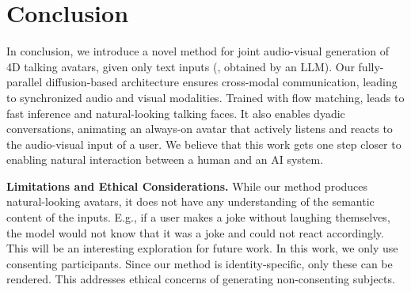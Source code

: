 \section{Conclusion}
\label{sec:conclusion}

In conclusion, we introduce a novel method for joint audio-visual generation of 4D talking avatars, given only text inputs (\eg, obtained by an LLM). Our fully-parallel diffusion-based architecture ensures cross-modal communication, leading to synchronized audio and visual modalities. Trained with flow matching, \MethodName leads to fast inference and natural-looking talking faces. It also enables dyadic conversations, animating an always-on avatar that actively listens and reacts to the audio-visual input of a user. We believe that this work gets one step closer to enabling natural interaction between a human and an AI system. 

\noindent
\textbf{Limitations and Ethical Considerations.}
While our method produces natural-looking avatars, it does not have any understanding of the semantic content of the inputs. E.g., if a user makes a joke without laughing themselves, the model would not know that it was a joke and could not react accordingly. This will be an interesting exploration for future work. In this work, we only use consenting participants. 
Since our method is identity-specific, only these can be rendered. 
This addresses ethical concerns of generating non-consenting subjects.

